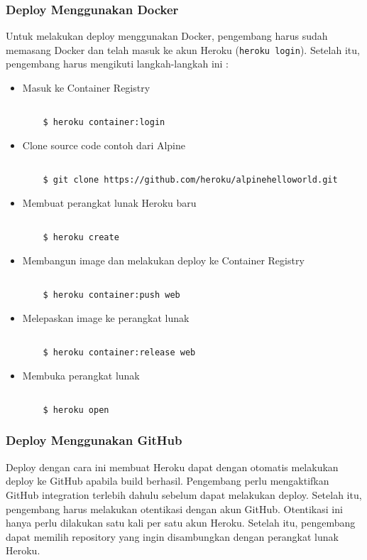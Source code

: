 \subsubsection{Deploy Menggunakan Docker}
Untuk melakukan deploy menggunakan Docker, pengembang harus sudah memasang Docker dan telah masuk ke akun Heroku (\texttt{heroku login}). Setelah itu, pengembang harus mengikuti langkah-langkah ini :
\begin{itemize}
\item Masuk ke Container Registry
\begin{lstlisting}

	$ heroku container:login

\end{lstlisting}

\item Clone source code contoh dari Alpine
\begin{lstlisting}

	$ git clone https://github.com/heroku/alpinehelloworld.git

\end{lstlisting}

\item Membuat perangkat lunak Heroku baru
\begin{lstlisting}

	$ heroku create

\end{lstlisting}

\item Membangun image dan melakukan deploy ke Container Registry
\begin{lstlisting}

	$ heroku container:push web

\end{lstlisting}

\item Melepaskan image ke perangkat lunak
\begin{lstlisting}

	$ heroku container:release web

\end{lstlisting}
\item Membuka perangkat lunak
\begin{lstlisting}

	$ heroku open

\end{lstlisting}
\end{itemize}

\subsubsection{Deploy Menggunakan GitHub}
Deploy dengan cara ini membuat Heroku dapat dengan otomatis melakukan deploy ke GitHub apabila build berhasil. Pengembang perlu mengaktifkan GitHub integration terlebih dahulu sebelum dapat melakukan deploy. Setelah itu, pengembang harus melakukan otentikasi dengan akun GitHub. Otentikasi ini hanya perlu dilakukan satu kali per satu akun Heroku. Setelah itu, pengembang dapat memilih repository yang ingin disambungkan dengan perangkat lunak Heroku. %

